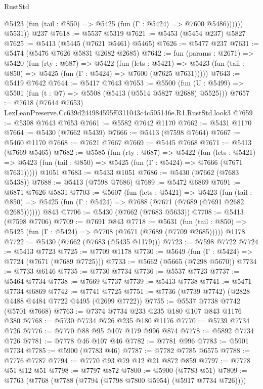 \begin{lexlean}{RustStd}
\begin{coremodule}
              @5423 (fun (tail : @850) => @5425 (fun (Γ : @5424) => @7600 @5486))))))
        @5531))
    @237
@7618 := @5537 @5319
@7621 := @5453 (@5454 @237) @5827
@7625 := @5413 (@5445 (@7621 @5461) @5465)
@7626 := @5477 @237
@7631 := @5474 (@5476 @7626 @5831 @2682 @2685)
@7642 := fun (params : @2671) =>
  @5420
    (fun (rty : @687) =>
    @5422
      (fun (lets : @5421) =>
      @5423 (fun (tail : @850) => @5425 (fun (Γ : @5424) => @7600 (@7625 @7631)))))
@7643 := @5419 @7642
@7644 := @5417 @7643
@7653 := @5500 (fun (U : @5499) => @5501 (fun (t : @7) => @5508 (@5413 (@5514 @5827 @2688) @5525)))
@7657 := @7618 (@7644 @7653) LexLeanPreserve.Cc639d244984595f0311043c4c505146e.R1.RustStd.look3
@7659 := @5398 @7643 @7653
@7661 := @5582 @7642 @1170
@7662 := @5431 @1170
@7664 := @5430 (@7662 @5439)
@7666 := @5413 (@7598 @7664)
@7667 := @5460 @1170
@7668 := @7621 @7667
@7669 := @5445 @7668
@7671 := @5413 (@7669 @5465)
@7682 := @5585
    (fun (rty : @687) =>
    @5422
      (fun (lets : @5421) =>
      @5423 (fun (tail : @850) => @5425 (fun (Γ : @5424) => @7666 (@7671 @7631)))))
    @1051
@7683 := @5433 @1051
@7686 := @5430 (@7662 (@7683 @5438))
@7688 := @5413 (@7598 @7686)
@7689 := @5472 @6869
@7691 := @6871 @7626 @5831
@7703 := @5607
    (fun (lets : @5421) =>
    @5423
      (fun (tail : @850) => @5425 (fun (Γ : @5424) => @7688 (@7671 (@7689 (@7691 @2682 @2685))))))
    @843
@7706 := @5430 (@7662 (@7683 @5633))
@7708 := @5413 (@7598 @7706)
@7709 := @7691 @843
@7718 := @5631
    (fun (tail : @850) => @5425 (fun (Γ : @5424) => @7708 (@7671 (@7689 (@7709 @2685)))))
    @1178
@7722 := @5430 (@7662 (@7683 (@5435 @1179)))
@7723 := @7598 @7722
@7724 := @5413 @7723
@7725 := @7709 @1178
@7730 := @5649 (fun (Γ : @5424) => @7724 (@7671 (@7689 @7725)))
@7733 := @5662 (@5665 (@7298 @5670))
@7734 := @7733 @6146
@7735 := @7730 @7734
@7736 := @5537 @7723
@7737 := @5464 @7734
@7738 := @7669 @7737
@7739 := @5413 @7738
@7741 := @5471 @7734 @6869
@7742 := @7741 @7725
@7751 := @7736 (@7739 @7742) (@2828 @4488 @4484 @7722 @4495 (@2699 @7722))
@7755 := @5537 @7738 @7742 (@5701 @7668)
@7763 := @7374 @7734 @233 @235 @180 @107 @843 @1176 @380
@7768 := @5730 @7734 @726 @235 @180 @1176
@7770 := @5739 @7734 @726
@7776 := @7770 @88 @95 @107 @179 @996 @874
@7778 := @5892 @7734 @726
@7781 := @7778 @46 @107 @46
@7782 := @7781 @996
@7783 := @5901 @7734
@7785 := @5900 (@7783 @46)
@7787 := @7782 @7785 @6575
@7788 := @7776 @7787
@7794 := @7770 @93 @79 @12 @21 @872 @859
@7797 := @7778 @51 @12 @51
@7798 := @7797 @872
@7800 := @5900 (@7783 @51)
@7809 := @7763 (@7768 (@7788 (@7794 (@7798 @7800 @5954) (@5917 @7734 @726))))

\end{coremodule}
\end{lexlean}
